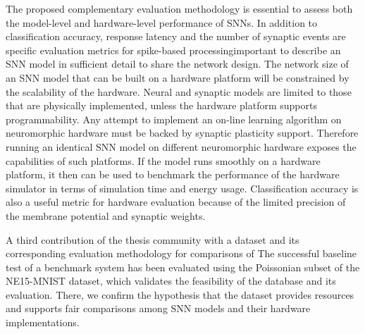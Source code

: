 The proposed complementary evaluation methodology is essential to assess both the model-level and hardware-level performance of SNNs.
In addition to classification accuracy, response latency and the number of synaptic events are specific evaluation metrics for \DIFaddbegin {}\DIFaddend spike-based processing\DIFdelbegin {}\DIFdelend \DIFaddbegin {}\DIFaddend important to describe an SNN model in sufficient detail to share the network design\DIFdelbegin {}\DIFdelend . 
The network size of an SNN model that can be built on a hardware platform will be constrained by the scalability of the hardware.
Neural and synaptic models are limited to those that are physically implemented, unless the hardware platform supports programmability.
Any attempt to implement an on-line learning algorithm on neuromorphic hardware must be backed by synaptic plasticity support.
Therefore running an identical SNN model on different neuromorphic hardware exposes the capabilities of such platforms.
If the model runs smoothly on a hardware platform, it then can be used to benchmark the performance of the hardware simulator in terms of simulation time and energy usage.
Classification accuracy \DIFdelbegin {}\DIFdelend is also a useful metric for hardware evaluation because of the limited precision of the membrane potential and synaptic weights.


A third contribution of the thesis \DIFdelbegin {}\DIFdelend \DIFaddbegin {}\DIFaddend community with a dataset and its corresponding evaluation methodology for comparisons of \DIFdelbegin {}\DIFdelend \DIFaddbegin {}\DIFaddend The successful baseline test of a benchmark system has been evaluated using the Poissonian subset of the NE15-MNIST dataset, which validates the feasibility of the database and its evaluation.
There, we confirm the hypothesis \DIFdelbegin {}\DIFdelend that the dataset provides resources and supports fair comparisons among SNN models and their hardware implementations.

